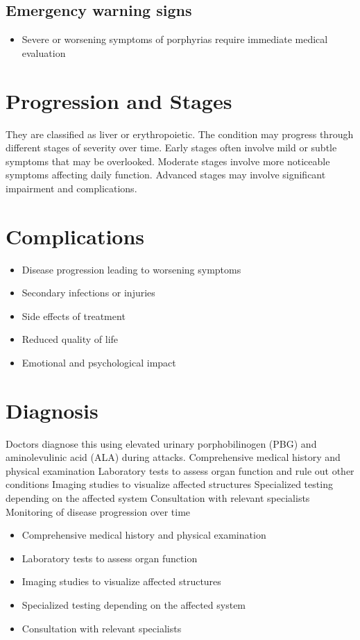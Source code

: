 \subsection{Emergency warning signs}
\begin{itemize}[noitemsep]
  \item Severe or worsening symptoms of porphyrias require immediate medical evaluation
\end{itemize}
\section{Progression and Stages}
They are classified as liver or erythropoietic. The condition may progress through different stages of severity over time. Early stages often involve mild or subtle symptoms that may be overlooked. Moderate stages involve more noticeable symptoms affecting daily function. Advanced stages may involve significant impairment and complications.
\section{Complications}
\begin{itemize}[noitemsep]
  \item Disease progression leading to worsening symptoms
  \item Secondary infections or injuries
  \item Side effects of treatment
  \item Reduced quality of life
  \item Emotional and psychological impact
\end{itemize}
\section{Diagnosis}
Doctors diagnose this using elevated urinary porphobilinogen (PBG) and aminolevulinic acid (ALA) during attacks. Comprehensive medical history and physical examination Laboratory tests to assess organ function and rule out other conditions Imaging studies to visualize affected structures Specialized testing depending on the affected system Consultation with relevant specialists Monitoring of disease progression over time

\begin{itemize}[noitemsep]
  \item Comprehensive medical history and physical examination
  \item Laboratory tests to assess organ function
  \item Imaging studies to visualize affected structures
  \item Specialized testing depending on the affected system
  \item Consultation with relevant specialists
\end{itemize}
